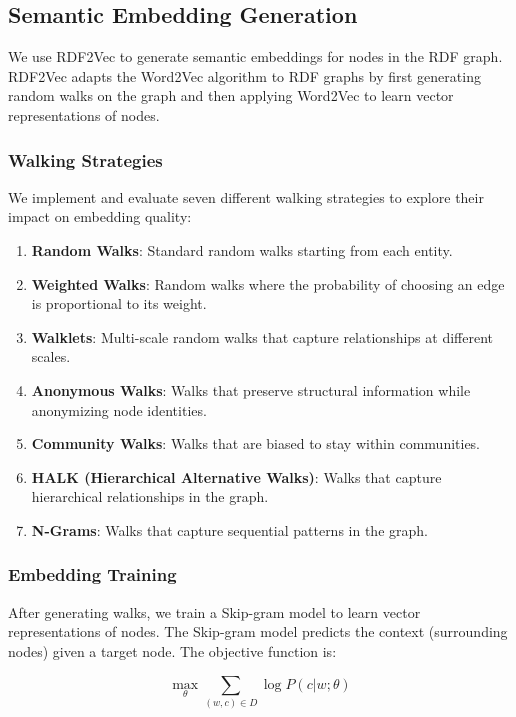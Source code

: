\documentclass[article,submit,pdftex,moreauthors]{Definitions/mdpi}
\begin{document}
\subsection{Semantic Embedding Generation}
We use RDF2Vec to generate semantic embeddings for nodes in the RDF graph. RDF2Vec adapts the Word2Vec algorithm to RDF graphs by first generating random walks on the graph and then applying Word2Vec to learn vector representations of nodes.

\subsubsection{Walking Strategies}
We implement and evaluate seven different walking strategies to explore their impact on embedding quality:

\begin{enumerate}
    \item \textbf{Random Walks}: Standard random walks starting from each entity.
    \item \textbf{Weighted Walks}: Random walks where the probability of choosing an edge is proportional to its weight.
    \item \textbf{Walklets}: Multi-scale random walks that capture relationships at different scales.
    \item \textbf{Anonymous Walks}: Walks that preserve structural information while anonymizing node identities.
    \item \textbf{Community Walks}: Walks that are biased to stay within communities.
    \item \textbf{HALK (Hierarchical Alternative Walks)}: Walks that capture hierarchical relationships in the graph.
    \item \textbf{N-Grams}: Walks that capture sequential patterns in the graph.
\end{enumerate}

\subsubsection{Embedding Training}
After generating walks, we train a Skip-gram model to learn vector representations of nodes. The Skip-gram model predicts the context (surrounding nodes) given a target node. The objective function is:

\begin{equation}
\max_\theta \sum_{(w, c) \in D} \log P(c | w; \theta)
\end{equation}
\end{document}
